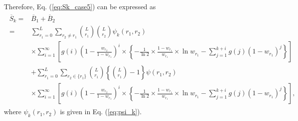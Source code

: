 \documentclass[dvipdfmx,english]{ampmt} %
\def\numberofspines{1}
\begin{document}
%
Therefore, Eq. (\ref{eq:Sk_case5}) can be expressed as
\begin{align}\begin{split}
  \overline{S}_k =& \overline{B}_1 + \overline{B}_2 \\
  =& \sum_{r_1=0}^{L} \sum_{r_2 \neq r_1} \binom{L}{r_1}\binom{L}{r_2}\psi_k(r_1,r_2)\\
  &\times\sum_{i=1}^{\infty} \left[ g(i) \left(1-\frac{w_{r_2}}{1-w_{r_1}} \right)^{i} \times \left\{ -\frac{1}{\ln 2} \times \frac{1-w_{r_1}}{w_{r_1}} \times \ln w_{r_1} - \sum_{j=1}^{k+i} g(j)(1-w_{r_1})^{j} \right\} \right] \\
  &+\sum_{r_1=0}^{L} \sum_{r_2 \in \{r_1\}} \binom{L}{r_1}\left\{\binom{L}{r_1}-1\right\} \psi(r_1,r_2) \\
  &\times\sum_{i=1}^{\infty} \left[ g(i) \left(1-\frac{w_{r_2}}{1-w_{r_1}} \right)^{i} \times \left\{ -\frac{1}{\ln 2} \times \frac{1-w_{r_1}}{w_{r_1}} \times \ln w_{r_1} - \sum_{j=1}^{k+i} g(j)(1-w_{r_1})^{j} \right\} \right],
\end{split}\end{align}
where $\psi_k(r_1,r_2)$ is given in Eq. (\ref{eq:psi_k}).
%
\fi
\ifoutputcover
\cleardoublepage
\makecover                      %
\makespine[\numberofspines]     %
\fi
\ifoutputabstractforsubmission
\makeabstractforsubmission      %
\fi
\end{document}
